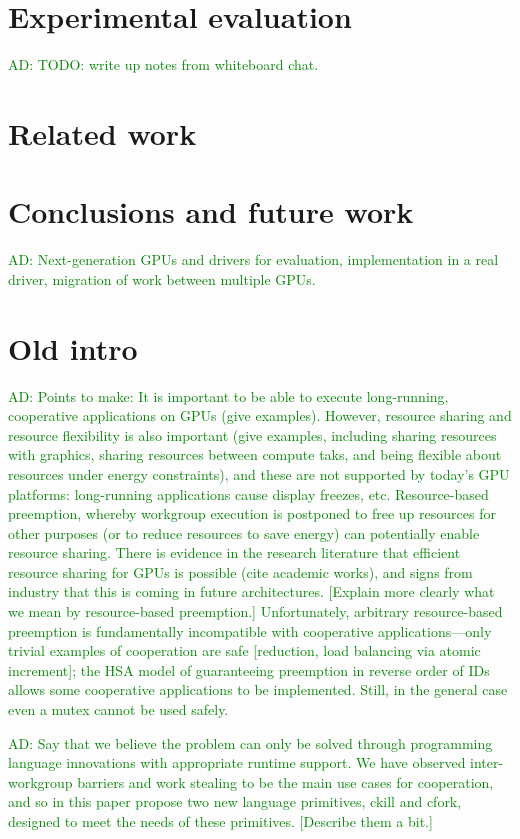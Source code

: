 \documentclass[nocopyrightspace]{sigplanconf-pldi16}
\newcommand{\ADComment}[1]{\textcolor{green}{AD: #1}}
\begin{document}
\section{Experimental evaluation}

\ADComment{TODO: write up notes from whiteboard chat.}


\section{Related work}

\section{Conclusions and future work}

\ADComment{Next-generation GPUs and drivers for evaluation,
  implementation in a real driver, migration of work between multiple
  GPUs.}

\section{Old intro}


\ADComment{Points to make: It is important to be able to execute
  long-running, cooperative applications on GPUs (give examples).
  However, resource sharing and resource flexibility is also important
  (give examples, including sharing resources with graphics, sharing
  resources between compute taks, and being flexible about resources
  under energy constraints), and these are not supported by today's
  GPU platforms: long-running applications cause display freezes, etc.
  Resource-based preemption, whereby workgroup execution is postponed
  to free up resources for other purposes (or to reduce resources to
  save energy) can potentially enable resource sharing.  There is
  evidence in the research literature that efficient resource sharing
  for GPUs is possible (cite academic works), and signs from industry
  that this is coming in future architectures.  [Explain more clearly
    what we mean by resource-based preemption.]  Unfortunately,
  arbitrary resource-based preemption is fundamentally incompatible
  with cooperative applications---only trivial examples of cooperation
  are safe [reduction, load balancing via atomic increment]; the HSA
  model of guaranteeing preemption in reverse order of IDs allows some
  cooperative applications to be implemented.  Still, in the general
  case even a mutex cannot be used safely.}

\ADComment{Say that we believe the problem can only be solved through
  programming language innovations with appropriate runtime support.
  We have observed inter-workgroup barriers and work stealing to be
  the main use cases for cooperation, and so in this paper propose two
  new language primitives, ckill and cfork, designed to meet the needs
  of these primitives.  [Describe them a bit.]}
\end{document}
